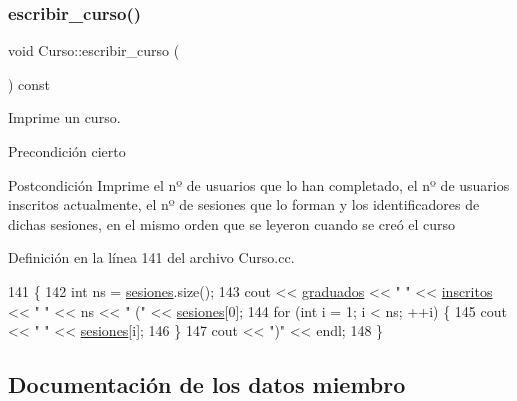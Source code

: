 \subsubsection{\texorpdfstring{escribir\+\_\+curso()}{escribir\_curso()}}
{\footnotesize\ttfamily void Curso\+::escribir\+\_\+curso (\begin{DoxyParamCaption}{ }\end{DoxyParamCaption}) const}



Imprime un curso. 

\begin{DoxyPrecond}{Precondición}
cierto 
\end{DoxyPrecond}
\begin{DoxyPostcond}{Postcondición}
Imprime el nº de usuarios que lo han completado, el nº de usuarios inscritos actualmente, el nº de sesiones que lo forman y los identificadores de dichas sesiones, en el mismo orden que se leyeron cuando se creó el curso 
\end{DoxyPostcond}


Definición en la línea 141 del archivo Curso.\+cc.


\begin{DoxyCode}
141                                        \{
142         \textcolor{keywordtype}{int} ns = \mbox{\hyperlink{class_curso_acd47bc8fe2f8121284246241d1e1dab5}{sesiones}}.size();
143         cout << \mbox{\hyperlink{class_curso_abf52f538c449c083d4c067a3329c6af2}{graduados}} << \textcolor{stringliteral}{" "} << \mbox{\hyperlink{class_curso_aef03f588dd91d57a6e679d05148fd971}{inscritos}} << \textcolor{stringliteral}{" "} << ns << \textcolor{stringliteral}{" ("} << 
      \mbox{\hyperlink{class_curso_acd47bc8fe2f8121284246241d1e1dab5}{sesiones}}[0];
144         \textcolor{keywordflow}{for} (\textcolor{keywordtype}{int} i = 1; i < ns; ++i) \{
145           cout << \textcolor{stringliteral}{" "} << \mbox{\hyperlink{class_curso_acd47bc8fe2f8121284246241d1e1dab5}{sesiones}}[i];
146         \}
147         cout << \textcolor{stringliteral}{")"} << endl;
148       \}
\end{DoxyCode}


\subsection{Documentación de los datos miembro}
\mbox{\label{class_curso_aef03f588dd91d57a6e679d05148fd971}} 
